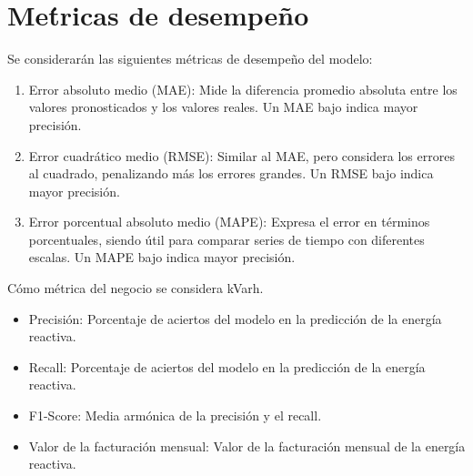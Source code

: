\section{Me\'tricas de desempe\~no}
Se considerar\'an las siguientes m\'etricas de desempe\~no del modelo: 

\begin{enumerate}
    \item Error absoluto medio (MAE): Mide la diferencia promedio absoluta entre los valores pronosticados y los valores reales. Un MAE bajo indica mayor precisi\'on.
    \item Error cuadrático medio (RMSE): Similar al MAE, pero considera los errores al cuadrado, penalizando m\'as los errores grandes. Un RMSE bajo indica mayor precisi\'on.
    \item Error porcentual absoluto medio (MAPE): Expresa el error en t\'erminos porcentuales, siendo \'util para comparar series de tiempo con diferentes escalas. Un MAPE bajo indica mayor precisi\'on.
\end{enumerate}

C\'omo m\'etrica del negocio se considera kVarh.
\begin{itemize}
    \item Precisi\'on: Porcentaje de aciertos del modelo en la predicci\'on de la energ\'ia reactiva.
    \item Recall: Porcentaje de aciertos del modelo en la predicci\'on de la energ\'ia reactiva.
    \item F1-Score: Media arm\'onica de la precisi\'on y el recall.
    \item Valor de la facturaci\'on mensual: Valor de la facturaci\'on mensual de la energ\'ia reactiva.
\end{itemize}